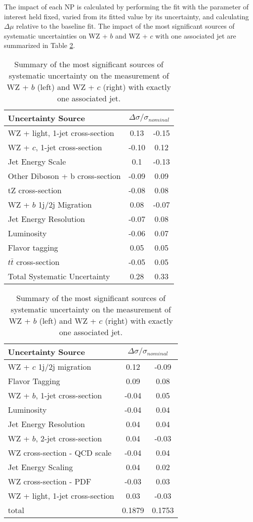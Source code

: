 The impact of each NP is calculated by performing the fit with the parameter of interest held fixed, varied from its fitted value by its uncertainty, and calculating $\Delta\mu$ relative to the baseline fit.  The impact of the most significant sources of systematic uncertainties on WZ + $b$ and WZ + $c$ with one associated jet are summarized in Table \ref{tab:systematics_1j}. 

\begin{table}[H]
    \centering
    \begin{tabular}{l|cc}
        \hline\hline
        Uncertainty Source & \multicolumn{2}{c}{$\Delta \sigma/\sigma_{nominal}$ }  \\
        \hline
        WZ + light, 1-jet cross-section & 0.13 & -0.15 \\
        WZ + $c$, 1-jet cross-section & -0.10 & 0.12 \\
        Jet Energy Scale & 0.1 & -0.13 \\
        Other Diboson + b cross-section & -0.09 & 0.09 \\
        tZ cross-section & -0.08 & 0.08 \\
        WZ + $b$ 1j/2j Migration & 0.08 & -0.07 \\
        Jet Energy Resolution & -0.07 & 0.08 \\
        Luminosity & -0.06 & 0.07 \\
        Flavor tagging & 0.05 & 0.05 \\
        $t\bar{t}$ cross-section & -0.05 & 0.05 \\
        \hline
        Total Systematic Uncertainty & 0.28 & 0.33 \\
        \hline\hline
    \end{tabular}
    \quad
    \begin{tabular}{l|cc}
        \hline\hline
        Uncertainty Source & \multicolumn{2}{c}{$\Delta \sigma/\sigma_{nominal}$ }  \\
        \hline
        WZ + $c$ 1j/2j migration & 0.12 & -0.09 \\
        Flavor Tagging & 0.09 & 0.08 \\
        WZ + $b$, 1-jet cross-section & -0.04 & 0.05 \\
        Luminosity & -0.04 & 0.04 \\
        Jet Energy Resolution & 0.04 & 0.04 \\
        WZ + $b$, 2-jet cross-section & 0.04 & -0.03 \\
        WZ cross-section - QCD scale & -0.04 & 0.04 \\
        Jet Energy Scaling & 0.04 & 0.02 \\
        WZ cross-section - PDF & -0.03 & 0.03 \\
        WZ + light, 1-jet cross-section & 0.03 & -0.03 \\
        \hline
        total & 0.1879 & 0.1753 \\
        \hline\hline
    \end{tabular}  
    \caption{Summary of the most significant sources of systematic uncertainty on the measurement of WZ + $b$ (left) and WZ + $c$ (right) with exactly one associated jet.}
    \label{tab:systematics_1j}
\end{table}

